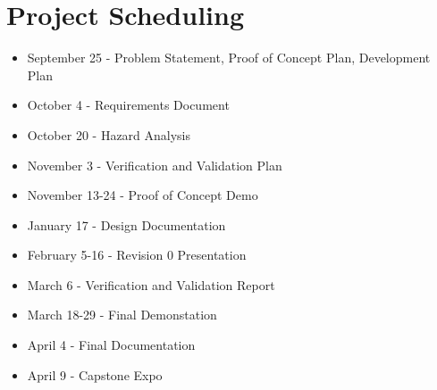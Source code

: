 \documentclass{article}
\begin{document}
\section{Project Scheduling}

\begin{itemize}
	\item September 25 - Problem Statement, Proof of Concept Plan, Development Plan
	\item October 4 - Requirements Document
	\item October 20 - Hazard Analysis
	\item November 3 - Verification and Validation Plan
	\item November 13-24 - Proof of Concept Demo
	\item January 17 - Design Documentation
	\item February 5-16 - Revision 0 Presentation
	\item March 6 - Verification and Validation Report
	\item March 18-29 - Final Demonstation
	\item April 4 - Final Documentation
	\item April 9 - Capstone Expo
\end {itemize}
\end{document}
